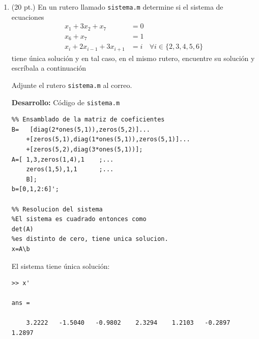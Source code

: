\documentclass[11pt]{article}
\begin{document}
\begin{enumerate}
\item (20 pt.)
En un rutero llamado \texttt{sistema.m} determine si el sistema de ecuaciones
$$
\begin{array}{lrc}
x_1+3x_2+x_7	& =0	& \\
x_6+x_7			& =1	& \\
x_{i}+2x_{i-1}+3x_{i+1} &= i & \forall i\in\{2,3,4,5,6\}
\end{array}
$$
tiene \'unica soluci\'on y en tal caso, en el mismo rutero, encuentre su soluci\'on y escr\'ibala a continuaci\'on


Adjunte el rutero \texttt{sistema.m} al correo.

\textbf{Desarrollo:} C\'odigo de \texttt{sistema.m} 
\begin{lstlisting}
%% Ensamblado de la matriz de coeficientes
B=   [diag(2*ones(5,1)),zeros(5,2)]...
    +[zeros(5,1),diag(1*ones(5,1)),zeros(5,1)]...
    +[zeros(5,2),diag(3*ones(5,1))];
A=[ 1,3,zeros(1,4),1    ;...
    zeros(1,5),1,1      ;...
    B];
b=[0,1,2:6]';

%% Resolucion del sistema
%El sistema es cuadrado entonces como
det(A)
%es distinto de cero, tiene unica solucion.
x=A\b
\end{lstlisting}

El sistema  
tiene \'unica soluci\'on: 

\begin{lstlisting}
>> x'

ans =

    3.2222   -1.5040   -0.9802    2.3294    1.2103   -0.2897    1.2897
\end{lstlisting}


\end{enumerate}
\end{document}
